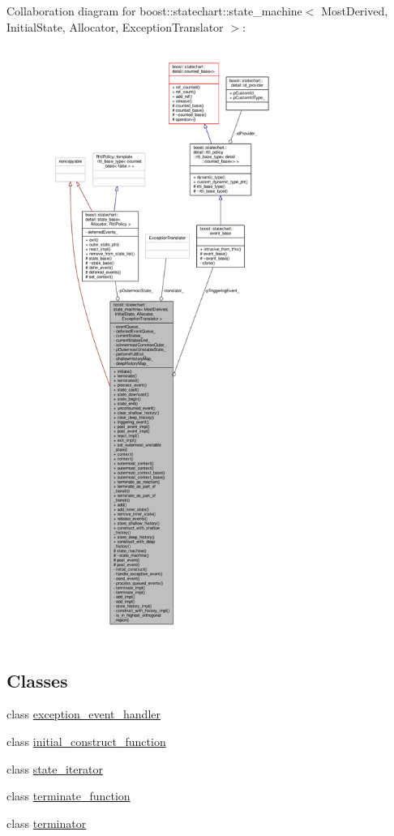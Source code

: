 Collaboration diagram for boost\+:\+:statechart\+:\+:state\+\_\+machine$<$ Most\+Derived, Initial\+State, Allocator, Exception\+Translator $>$\+:
\nopagebreak
\begin{figure}[H]
\begin{center}
\leavevmode
\includegraphics[height=550pt]{classboost_1_1statechart_1_1state__machine__coll__graph}
\end{center}
\end{figure}
\subsection*{Classes}
\begin{DoxyCompactItemize}
\item 
class \mbox{\hyperlink{classboost_1_1statechart_1_1state__machine_1_1exception__event__handler}{exception\+\_\+event\+\_\+handler}}
\item 
class \mbox{\hyperlink{classboost_1_1statechart_1_1state__machine_1_1initial__construct__function}{initial\+\_\+construct\+\_\+function}}
\item 
class \mbox{\hyperlink{classboost_1_1statechart_1_1state__machine_1_1state__iterator}{state\+\_\+iterator}}
\item 
class \mbox{\hyperlink{classboost_1_1statechart_1_1state__machine_1_1terminate__function}{terminate\+\_\+function}}
\item 
class \mbox{\hyperlink{classboost_1_1statechart_1_1state__machine_1_1terminator}{terminator}}
\end{DoxyCompactItemize}
